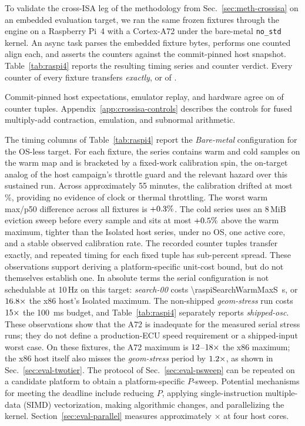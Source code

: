 To validate the cross-ISA leg of the methodology from Sec.~\ref{sec:meth-crossisa} on an
embedded evaluation target, we ran the same frozen fixtures through the engine on a
Raspberry Pi~4 with a Cortex-A72 under the bare-metal \texttt{no\_std} kernel. An async task
parses the embedded fixture bytes, performs one counted align each, and asserts the counters
against the commit-pinned host snapshot. Table~\ref{tab:raspi4} reports the resulting
timing series and counter verdict. Every counter of every fixture transfers
\emph{exactly}, or \raspiExact{} of \raspiTotal{}.

Commit-pinned host expectations, emulator replay, and hardware agree on
\raspiDeviceOk{} of \raspiTotal{} counter tuples. Appendix~\ref{app:crossisa-controls}
describes the controls for fused multiply-add contraction, emulation, and subnormal
arithmetic.

The timing columns of Table~\ref{tab:raspi4} report the \emph{Bare-metal} configuration for
the OS-less target. For each fixture, the series contains
\raspiTimingSamples{} warm and \raspiTimingCold{} cold samples on the warm map and is
bracketed by a fixed-work
calibration spin, the on-target analog of the host campaign's throttle guard and the
relevant hazard over this sustained run. Across approximately 55 minutes, the calibration
drifted at most \raspiCalibDriftPct\%, providing no evidence of clock or thermal throttling.
The worst warm max/p50 difference across all fixtures is
${+}0.3\%$. The cold series uses an 8\,MiB eviction sweep before every
sample and sits at most ${+}0.5\%$ above the warm maximum, tighter than
the Isolated host series, under no OS, one active core, and a stable observed calibration rate.
The recorded counter tuples transfer exactly, and repeated timing for each fixed tuple has
sub-percent spread. These observations support deriving a
platform-specific unit-cost bound, but do not themselves establish one. In
absolute terms the serial configuration is not schedulable at 10\,Hz on this target:
\emph{search-00} costs \SI{\raspiSearchWarmMaxS}{s}, or $16.8\times$ the
x86 host's Isolated maximum. The non-shipped \emph{geom-stress} run costs
$15\times$ the \SI{100}{ms} budget, and Table~\ref{tab:raspi4}
separately reports \emph{shipped-osc}. These observations show that the A72 is inadequate
for the measured serial stress runs; they do not define a production-ECU speed requirement
or a shipped-input worst case. On these fixtures, the A72 maximum is
$12$--$18\times$ the x86 maximum; the x86 host itself
also misses the \emph{geom-stress} period by $1.2\times$, as shown in
Sec.~\ref{sec:eval-twotier}. The protocol of Sec.~\ref{sec:eval-psweep} can be repeated on
a candidate platform to obtain a platform-specific $P$-sweep. Potential mechanisms for
meeting the deadline include reducing $P$, applying
single-instruction multiple-data (SIMD) vectorization, making
algorithmic changes, and parallelizing the kernel. Section~\ref{sec:eval-parallel} measures
approximately
\parRustSpeedupFour$\times$ at four host cores.

